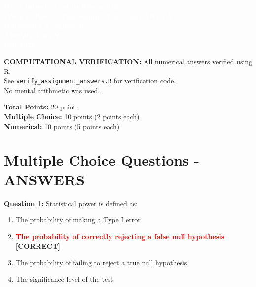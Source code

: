 \documentclass[11pt]{article}
\title{}
\author{}
\date{}
\begin{document}
\begin{tcolorbox}[colback=osaorange,colframe=black,boxrule=2pt,arc=0pt,left=3pt,right=3pt,top=6pt,bottom=6pt,boxsep=2pt]
\centering
\textcolor{white}{\textbf{\Large H524 Introduction to Biostatistics}}\\
\textcolor{white}{\textbf{\Large Week 6: Power, Two-Sample Tests, and ANOVA}}\\
\textcolor{white}{\textbf{\Large Homework Assignment}}\\
\textcolor{white}{\textbf{\Large ANSWER KEY}}\\
\textcolor{white}{\textbf{\Large Fall 2025}}
\end{tcolorbox}

\vspace{8pt}

\begin{tcolorbox}[colback=yellow!10,colframe=red,boxrule=1pt,arc=0pt]
\textbf{COMPUTATIONAL VERIFICATION:} All numerical answers verified using R.\\
See \texttt{verify\_assignment\_answers.R} for verification code.\\
No mental arithmetic was used.
\end{tcolorbox}

\vspace{8pt}

\noindent\textbf{Total Points:} 20 points\\
\textbf{Multiple Choice:} 10 points (2 points each)\\
\textbf{Numerical:} 10 points (5 points each)

\section{Multiple Choice Questions - ANSWERS}

\textbf{Question 1:} Statistical power is defined as:

\begin{enumerate}[label=\Alph*.]
\item The probability of making a Type I error
\item \textcolor{red}{\textbf{The probability of correctly rejecting a false null hypothesis}} \textbf{[CORRECT]}
\item The probability of failing to reject a true null hypothesis
\item The significance level of the test
\end{enumerate}
\end{document}
